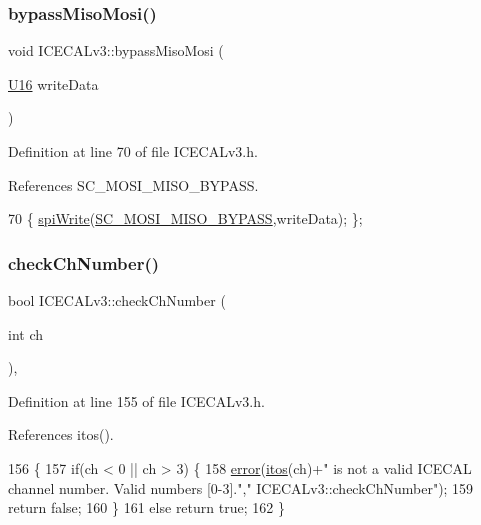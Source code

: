 \subsubsection{\texorpdfstring{bypass\+Miso\+Mosi()}{bypassMisoMosi()}}
{\footnotesize\ttfamily void I\+C\+E\+C\+A\+Lv3\+::bypass\+Miso\+Mosi (\begin{DoxyParamCaption}\item[{\hyperlink{ICECALv3_8h_adf928e51a60dba0df29d615401cc55a8}{U16}}]{write\+Data }\end{DoxyParamCaption})\hspace{0.3cm}{\ttfamily [inline]}}



Definition at line 70 of file I\+C\+E\+C\+A\+Lv3.\+h.



References S\+C\+\_\+\+M\+O\+S\+I\+\_\+\+M\+I\+S\+O\+\_\+\+B\+Y\+P\+A\+SS.


\begin{DoxyCode}
70 \{       \hyperlink{classICECALv3_aef00f02801dea4bda2093c930501dcdd}{spiWrite}(\hyperlink{ICECALv3_8h_a2870f5a3cad23b2b4e7f16faefe8ef2e}{SC\_MOSI\_MISO\_BYPASS},writeData); \};
\end{DoxyCode}
\mbox{\label{classICECALv3_a8753a74558f988b346a3fe350c5bbad4}} 
\subsubsection{\texorpdfstring{check\+Ch\+Number()}{checkChNumber()}}
{\footnotesize\ttfamily bool I\+C\+E\+C\+A\+Lv3\+::check\+Ch\+Number (\begin{DoxyParamCaption}\item[{int}]{ch }\end{DoxyParamCaption})\hspace{0.3cm}{\ttfamily [inline]}, {\ttfamily [private]}}



Definition at line 155 of file I\+C\+E\+C\+A\+Lv3.\+h.



References itos().


\begin{DoxyCode}
156     \{
157         \textcolor{keywordflow}{if}(ch < 0 || ch > 3) \{
158             \hyperlink{classObject_a204a95f57818c0f811933917a30eff45}{error}(\hyperlink{Tools_8h_af330027dbdafb9a30768b3613c553e60}{itos}(ch)+\textcolor{stringliteral}{" is not a valid ICECAL channel number. Valid numbers [0-3]."},\textcolor{stringliteral}{"
      ICECALv3::checkChNumber"});
159             \textcolor{keywordflow}{return} \textcolor{keyword}{false};
160         \}
161         \textcolor{keywordflow}{else} \textcolor{keywordflow}{return} \textcolor{keyword}{true};
162     \}
\end{DoxyCode}
\mbox{\label{classICECALv3_ac26be912fb72e615106fceb4626aa548}} 
